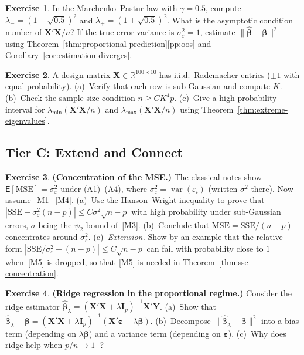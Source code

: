 \documentclass[12pt,a4paper]{article}
\theoremstyle{definition}
\newtheorem{exercise}{Exercise}[section]
\newcommand\expc{\mathsf{E}}
\DeclareMathOperator\var{var}
\newcommand{\SSE}{\mathrm{SSE}}
\newcommand{\MSE}{\mathrm{MSE}}
\newcommand{\bX}{\mathbf{X}}
\newcommand{\bY}{\mathbf{Y}}
\def\bb{\boldsymbol{\beta}}
\newcommand{\be}{\boldsymbol{\varepsilon}}
\newcommand{\bI}{\mathbf{I}}
\newcommand{\Real}{\mathbb{R}}
\newcommand{\hbb}{\hat{\boldsymbol{\beta}}}
\begin{document}
\begin{exercise}\label{ex:mB3}
In the Marchenko--Pastur law with $\gamma = 0.5$, compute $\lambda_- = (1-\sqrt{0.5})^2$ and $\lambda_+ = (1+\sqrt{0.5})^2$. What is the asymptotic condition number of $\bX'\bX/n$? If the true error variance is $\sigma_\varepsilon^2 = 1$, estimate $\|\hbb - \bb\|^2$ using Theorem~\ref{thm:proportional-prediction}\ref{pp:oos} and Corollary~\ref{cor:estimation-diverges}.
\end{exercise}

\begin{exercise}\label{ex:mB4}
A design matrix $\bX \in \Real^{100 \times 10}$ has i.i.d.\ Rademacher entries ($\pm 1$ with equal probability). (a)~Verify that each row is sub-Gaussian and compute $K$. (b)~Check the sample-size condition $n \geqslant CK^4 p$. (c)~Give a high-probability interval for $\lambda_{\min}(\bX'\bX/n)$ and $\lambda_{\max}(\bX'\bX/n)$ using Theorem~\ref{thm:extreme-eigenvalues}.
\end{exercise}

\subsection*{Tier C: Extend and Connect}

\begin{exercise}\label{ex:mC1}
\textbf{(Concentration of the MSE.)} The classical notes show $\expc[\MSE] = \sigma_\varepsilon^2$ under (A1)--(A4), where $\sigma_\varepsilon^2 = \var(\varepsilon_i)$ (written $\sigma^2$ there). Now assume~\ref{M1}--\ref{M4}. (a)~Use the Hanson--Wright inequality to prove that $|\SSE - \sigma_\varepsilon^2(n-p)| \leqslant C\sigma^2\sqrt{n-p}$ with high probability under sub-Gaussian errors, $\sigma$ being the $\psi_2$ bound of~\ref{M3}. (b)~Conclude that $\MSE = \SSE/(n-p)$ concentrates around $\sigma_\varepsilon^2$. (c)~\emph{Extension.} Show by an example that the relative form $|\SSE/\sigma_\varepsilon^2 - (n-p)| \leqslant C\sqrt{n-p}$ can fail with probability close to $1$ when~\ref{M5} is dropped, so that~\ref{M5} is needed in Theorem~\ref{thm:sse-concentration}.
\end{exercise}

\begin{exercise}\label{ex:mC2}
\textbf{(Ridge regression in the proportional regime.)} Consider the ridge estimator $\hbb_\lambda = (\bX'\bX + \lambda\bI_p)^{-1}\bX'\bY$. (a)~Show that $\hbb_\lambda - \bb = (\bX'\bX + \lambda\bI_p)^{-1}(\bX'\be - \lambda\bb)$. (b)~Decompose $\|\hbb_\lambda - \bb\|^2$ into a bias term (depending on $\lambda\bb$) and a variance term (depending on $\be$). (c)~Why does ridge help when $p/n \to 1^-$?
\end{exercise}
\end{document}
